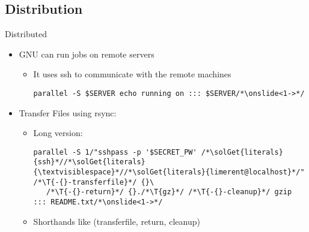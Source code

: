 \subsection{Distribution}
{
\begin{frame}[fragile]{Distributed}
\begin{itemize}[<+(1)->]
   \itemsep6pt
   \item GNU \LogoParallel can run jobs on remote servers \begin{itemize}
      \item It uses ssh to communicate with the remote machines\pause
      \begin{verbatim}
parallel -S $SERVER echo running on ::: $SERVER/*\onslide<1->*/
      \end{verbatim}
   \end{itemize}
   \item Transfer Files using rsync:
\begin{itemize}
   \item Long version:
   \begin{verbatim}
parallel -S 1/"sshpass -p '$SECRET_PW' /*\solGet{literals}{ssh}*//*\solGet{literals}{\textvisiblespace}*//*\solGet{literals}{limerent@localhost}*/" /*\T{-{}-transferfile}*/ {}\
   /*\T{-{}-return}*/ {}./*\T{gz}*/ /*\T{-{}-cleanup}*/ gzip ::: README.txt/*\onslide<1->*/
   \end{verbatim}
   \item Shorthands like  (transferfile, return, cleanup)
\end{itemize}
\end{itemize}
\end{frame}
\SidebarReset

}

